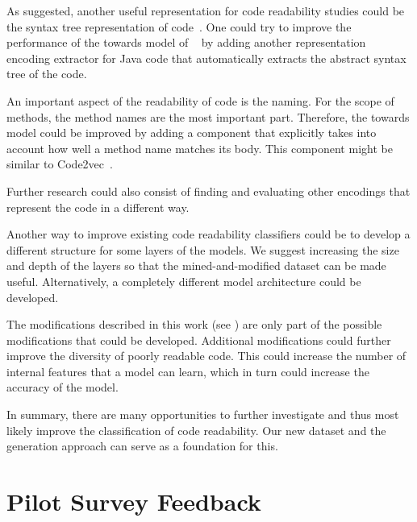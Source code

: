 \documentclass[%
class=scrreprt,
chapterprefix=false,%
open=right,%
twoside=false,%
paper=a4,%
logofile={Logo\_zentral\_farbig\_EN.png},%
thesistype=master,%
UKenglish,%
]{se2thesis}
\renewcommand{\thesection}{\arabic{section}}
\renewcommand{\thechapter}{\arabic{chapter}.0}
\theoremstyle{definition}
\begin{document}
	As \citeauthor{mi2023graph} suggested, another useful representation for code readability studies could be the syntax tree representation of code~\cite{mi2023graph}. One could try to improve the performance of the towards model of \citeauthor{mi2022towards}~\cite{mi2022towards} by adding another representation encoding extractor for Java code that automatically extracts the abstract syntax tree of the code.
	
	An important aspect of the readability of code is the naming. For the scope of methods, the method names are the most important part. Therefore, the towards model could be improved by adding a component that explicitly takes into account how well a method name matches its body. This component might be similar to Code2vec~\cite{alon2019code2vec}.
	
	Further research could also consist of finding and evaluating other encodings that represent the code in a different way.
	
	Another way to improve existing code readability classifiers could be to develop a different structure for some layers of the models. We suggest increasing the size and depth of the layers so that the mined-and-modified dataset can be made useful. Alternatively, a completely different model architecture could be developed. 
	
	The modifications described in this work (see ) are only part of the possible modifications that could be developed. Additional modifications could further improve the diversity of poorly readable code. This could increase the number of internal features that a model can learn, which in turn could increase the accuracy of the model.
	
	In summary, there are many opportunities to further investigate and thus most likely improve the classification of code readability. Our new dataset and the generation approach can serve as a foundation for this.
	
\backmatter

\printbibliography
	
	\appendix
	\renewcommand{\thechapter}{\alph{chapter}}
	\renewcommand{\thesection}{\Roman{section}}
	\renewcommand{\thesubsection}{\fnsymbol{subsection}}
	
\pagebreak
\section{Pilot Survey Feedback}\label{appendix:pilot-survey-feedback}
\end{document}
